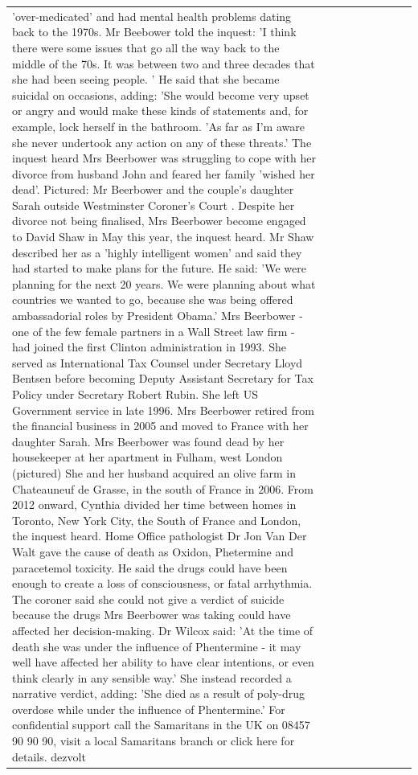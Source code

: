 \begin{table}[H]
\begin{tabular}{lllrlllll}
'over-medicated' and had mental health problems dating back to the 1970s. Mr Beebower told the inquest: 'I think there were some issues that go all the way back to the middle of the 70s. It was between two and three decades that she had been seeing people. ' He said that she became suicidal on occasions, adding: 'She would become very upset or angry and would make these kinds of statements and, for example, lock herself in the bathroom. 'As far as I'm aware she never undertook any action on any of these threats.' The inquest heard Mrs Beerbower was struggling to cope with her divorce from husband John and feared her family 'wished her dead'. Pictured: Mr Beerbower and the couple's daughter Sarah outside Westminster Coroner's Court . Despite her divorce not being finalised, Mrs Beerbower become engaged to David Shaw in May this year, the inquest heard. Mr Shaw described her as a 'highly intelligent women' and said they had started to make plans for the future. He said: 'We were planning for the next 20 years. We were planning about what countries we wanted to go, because she was being offered ambassadorial roles by President Obama.' Mrs Beerbower - one of the few female partners in a Wall Street law firm - had joined the first Clinton administration in 1993. She served as International Tax Counsel under Secretary Lloyd Bentsen before becoming Deputy Assistant Secretary for Tax Policy under Secretary Robert Rubin. She left US Government service in late 1996. Mrs Beerbower retired from the financial business in 2005 and moved to France with her daughter Sarah. Mrs Beerbower was found dead by her housekeeper at her apartment in Fulham, west London (pictured) She and her husband acquired an olive farm in Chateauneuf de Grasse, in the south of France in 2006. From 2012 onward, Cynthia divided her time between homes in Toronto, New York City, the South of France and London, the inquest heard. Home Office pathologist Dr Jon Van Der Walt gave the cause of death as Oxidon, Phetermine and paracetemol toxicity. He said the drugs could have been enough to create a loss of consciousness, or fatal arrhythmia. The coroner said she could not give a verdict of suicide because the drugs Mrs Beerbower was taking could have affected her decision-making. Dr Wilcox said: 'At the time of death she was under the influence of Phentermine - it may well have affected her ability to have clear intentions, or even think clearly in any sensible way.' She instead recorded a narrative verdict, adding: 'She died as a result of poly-drug overdose while under the influence of Phentermine.' For confidential support call the Samaritans in the UK on 08457 90 90 90, visit a local Samaritans branch or click here for details. dezvolt \\

\end{tabular}
\end{table}
